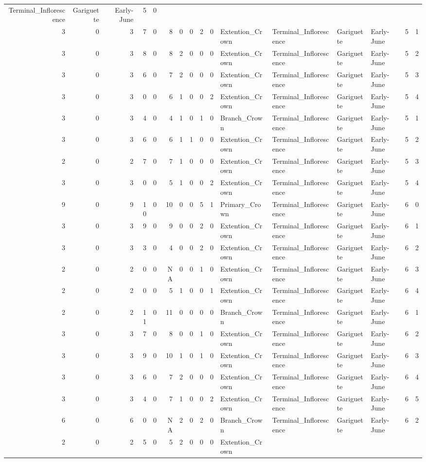 \documentclass[]{article}
\begin{document}
\begin{longtable}[]{@{}rrrrrrrrrrllllrl@{}}
Terminal\_Inflorescence & Gariguette & Early-June & 5 & 0\tabularnewline
3 & 0 & 3 & 7 & 0 & 8 & 0 & 0 & 2 & 0 & Extention\_Crown &
Terminal\_Inflorescence & Gariguette & Early-June & 5 & 1\tabularnewline
3 & 0 & 3 & 8 & 0 & 8 & 2 & 0 & 0 & 0 & Extention\_Crown &
Terminal\_Inflorescence & Gariguette & Early-June & 5 & 2\tabularnewline
3 & 0 & 3 & 6 & 0 & 7 & 2 & 0 & 0 & 0 & Extention\_Crown &
Terminal\_Inflorescence & Gariguette & Early-June & 5 & 3\tabularnewline
3 & 0 & 3 & 0 & 0 & 6 & 1 & 0 & 0 & 2 & Extention\_Crown &
Terminal\_Inflorescence & Gariguette & Early-June & 5 & 4\tabularnewline
3 & 0 & 3 & 4 & 0 & 4 & 1 & 0 & 1 & 0 & Branch\_Crown &
Terminal\_Inflorescence & Gariguette & Early-June & 5 & 1\tabularnewline
3 & 0 & 3 & 6 & 0 & 6 & 1 & 1 & 0 & 0 & Extention\_Crown &
Terminal\_Inflorescence & Gariguette & Early-June & 5 & 2\tabularnewline
2 & 0 & 2 & 7 & 0 & 7 & 1 & 0 & 0 & 0 & Extention\_Crown &
Terminal\_Inflorescence & Gariguette & Early-June & 5 & 3\tabularnewline
3 & 0 & 3 & 0 & 0 & 5 & 1 & 0 & 0 & 2 & Extention\_Crown &
Terminal\_Inflorescence & Gariguette & Early-June & 5 & 4\tabularnewline
9 & 0 & 9 & 10 & 0 & 10 & 0 & 0 & 5 & 1 & Primary\_Crown &
Terminal\_Inflorescence & Gariguette & Early-June & 6 & 0\tabularnewline
3 & 0 & 3 & 9 & 0 & 9 & 0 & 0 & 2 & 0 & Extention\_Crown &
Terminal\_Inflorescence & Gariguette & Early-June & 6 & 1\tabularnewline
3 & 0 & 3 & 3 & 0 & 4 & 0 & 0 & 2 & 0 & Extention\_Crown &
Terminal\_Inflorescence & Gariguette & Early-June & 6 & 2\tabularnewline
2 & 0 & 2 & 0 & 0 & NA & 0 & 0 & 1 & 0 & Extention\_Crown &
Terminal\_Inflorescence & Gariguette & Early-June & 6 & 3\tabularnewline
2 & 0 & 2 & 0 & 0 & 5 & 1 & 0 & 0 & 1 & Extention\_Crown &
Terminal\_Inflorescence & Gariguette & Early-June & 6 & 4\tabularnewline
2 & 0 & 2 & 11 & 0 & 11 & 0 & 0 & 0 & 0 & Branch\_Crown &
Terminal\_Inflorescence & Gariguette & Early-June & 6 & 1\tabularnewline
3 & 0 & 3 & 7 & 0 & 8 & 0 & 0 & 1 & 0 & Extention\_Crown &
Terminal\_Inflorescence & Gariguette & Early-June & 6 & 2\tabularnewline
3 & 0 & 3 & 9 & 0 & 10 & 1 & 0 & 1 & 0 & Extention\_Crown &
Terminal\_Inflorescence & Gariguette & Early-June & 6 & 3\tabularnewline
3 & 0 & 3 & 6 & 0 & 7 & 2 & 0 & 0 & 0 & Extention\_Crown &
Terminal\_Inflorescence & Gariguette & Early-June & 6 & 4\tabularnewline
3 & 0 & 3 & 4 & 0 & 7 & 1 & 0 & 0 & 2 & Extention\_Crown &
Terminal\_Inflorescence & Gariguette & Early-June & 6 & 5\tabularnewline
6 & 0 & 6 & 0 & 0 & NA & 2 & 0 & 2 & 0 & Branch\_Crown &
Terminal\_Inflorescence & Gariguette & Early-June & 6 & 2\tabularnewline
2 & 0 & 2 & 5 & 0 & 5 & 2 & 0 & 0 & 0 & Extention\_Crown &

\end{longtable}
\end{document}

